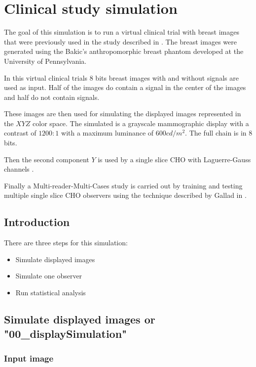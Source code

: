 \chapter{Clinical study simulation}
\minitoc{}

The goal of this simulation is to run a virtual clinical trial with breast images that were previously used in the study described in \cite{Mar12}. The breast images were generated using the Bakic's anthropomorphic breast phantom developed at the University of Pennsylvania.

In this virtual clinical trials 8 bits breast images with and without signals are used as input. Half of the images do contain a signal in the center of the images and half do not contain signals.

These images are then used for simulating the displayed images represented in the $XYZ$ color space. The simulated is a grayscale mammographic display with a contrast of $1200:1$ with a maximum luminance of $600cd/m^2$. The full chain is in 8 bits.

Then the second component $Y$ is used by a single slice CHO with Laguerre-Gauss channels \cite{Pla09a,Mye87}.

Finally a Multi-reader-Multi-Cases study is carried out by training and testing multiple single slice CHO observers using the technique described by Gallad in \cite{Gal06}.


\section{Introduction}

There are three steps for this simulation:

\begin{itemize}
\item Simulate displayed images
\item Simulate one observer
\item Run statistical analysis
\end{itemize}

\section{Simulate displayed images or "00\_displaySimulation"}

\subsection{Input image}

